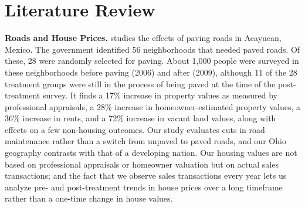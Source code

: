 \section{Literature Review}  \label{sec:lit_review}

{\bf Roads and House Prices.} \cite{gonzalez2016paving} studies the effects of paving roads in Acayucan, Mexico. The government identified 56 neighborhoods that needed paved roads. Of these, 28 were randomly selected for paving. About 1,000 people were surveyed in these neighborhoods before paving (2006) and after (2009), although 11 of the 28 treatment groups were still in the process of being paved at the time of the post-treatment survey.  It finds a 17\% increase in property values as measured by professional appraisals, a 28\% increase in homeowner-estimated property values, a 36\% increase in rents, and a 72\% increase in vacant land values, along with effects on a few non-housing outcomes.  Our study evaluates cuts in road maintenance rather than a switch from unpaved to paved roads, and our Ohio geography contrasts with that of a developing nation.  Our housing values are not based on professional appraisals or homeowner valuation but on actual sales transactions; and the fact that we observe sales transactions every year lets us analyze pre- and post-treatment trends in house prices over a long timeframe rather than a one-time change in house values. 


